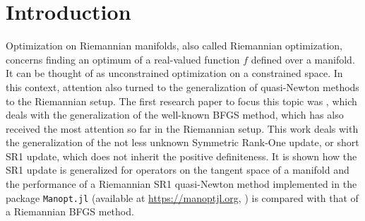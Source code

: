 \chapter{Introduction}

Optimization on Riemannian manifolds, also called Riemannian optimization, concerns finding an optimum of a real-valued function $f$ defined over a manifold. It can be thought of as unconstrained optimization on a constrained space. In this context, attention also turned to the generalization of quasi-Newton methods to the Riemannian setup. The first research paper to focus this topic was \cite{Gabay:1982}, which deals with the generalization of the well-known BFGS method, which has also received the most attention so far in the Riemannian setup. This work deals with the generalization of the not less unknown Symmetric Rank-One update, or short SR1 update, which does not inherit the positive definiteness. It is shown how the SR1 update is generalized for operators on the tangent space of a manifold and the performance of a Riemannian SR1 quasi-Newton method implemented in the package \lstinline!Manopt.jl! (available at \url{https://manoptjl.org}, \cite{Bergmann:2019}) is compared with that of a Riemannian BFGS method.
